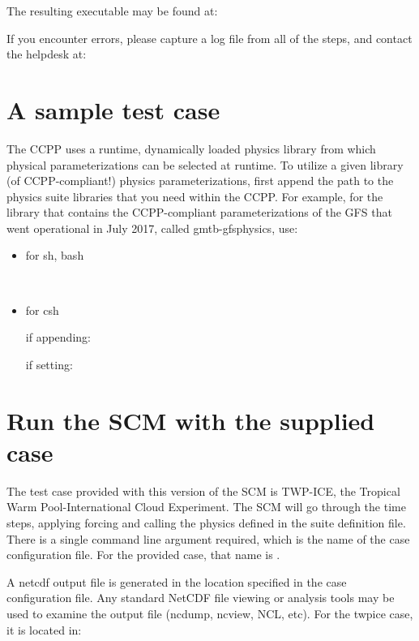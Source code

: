 The resulting executable may be found at: 


If you encounter errors, please capture a log file from all of the steps, and contact the helpdesk at: 

\section{A sample test case}

The CCPP uses a runtime, dynamically loaded physics library from which physical parameterizations can be selected at runtime.  To utilize a given library (of CCPP-compliant!) physics parameterizations, first append the path to the physics suite libraries that you need
within the CCPP. For example, for the library that contains the CCPP-compliant parameterizations of the GFS that went operational in July 2017,
called gmtb-gfsphysics, use:
\begin{itemize}
	\item for sh, bash

     \\

	\item for csh

     if appending: \\

     if setting: \\
\end{itemize}


\section{Run the SCM with the supplied case} 
The test case provided with this version of the SCM is TWP-ICE, the Tropical Warm Pool-International Cloud Experiment. The SCM will go through the time steps, applying forcing and calling the physics defined in the suite definition file.
There is a single command line argument required, which is the name of the case configuration file.  For the provided case, that name is .


A netcdf output file is generated in the location specified in the case
configuration file. Any standard NetCDF file viewing or analysis tools may be used to 
examine the output file (ncdump, ncview, NCL, etc).  For the twpice case, it is located in:

